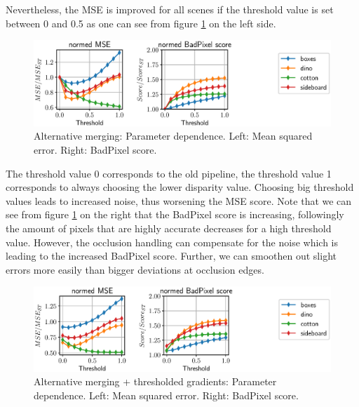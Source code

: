 \documentclass  [
  paper    = a4,
  BCOR     = 10mm,
  twoside,
  fontsize = 12pt,
  fleqn,
  toc      = bibnumbered,
  toc      = listofnumbered,
  numbers  = noendperiod,
  headings = normal,
  listof   = leveldown,
  version  = 3.03
]                                       {scrreprt}
\begin{document}
Nevertheless, the MSE is improved for all scenes if the threshold value is set between 0 and 0.5 as one can see from figure \ref{fig:chooselowerparams} on the left side.
\begin{figure}[h!]
	\centering
	\includegraphics[width=1\linewidth]{images/choose_lower_params}
	\caption[Alternative merging: Parameter dependence]{Alternative merging: Parameter dependence. Left: Mean squared error. Right: BadPixel score.}
	\label{fig:chooselowerparams}
\end{figure}
The threshold value 0 corresponds to the old pipeline, the threshold value 1 corresponds to always choosing the lower disparity value. Choosing big threshold values leads to increased noise, thus worsening the MSE score. Note that we can see from figure \ref{fig:chooselowerparams} on the right that the BadPixel score is increasing, followingly the amount of pixels that are highly accurate decreases for a high threshold value. However, the occlusion handling can compensate for the noise which is leading to the increased BadPixel score. Further, we can smoothen out slight errors more easily than bigger deviations at occlusion edges.
\begin{figure}[h!]
	\centering
	\includegraphics[width=1\linewidth]{images/choose_lower_params_thresh}
	\caption[Alternative merging: Parameter dependence]{Alternative merging + thresholded gradients: Parameter dependence. Left: Mean squared error. Right: BadPixel score.}
	\label{fig:chooselowerparamsthresh}
\end{figure}
\end{document}
